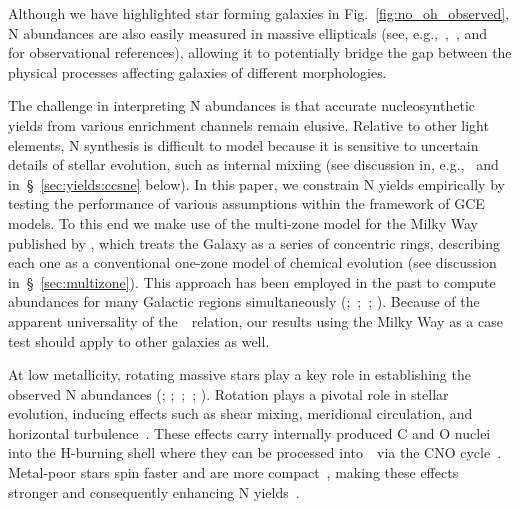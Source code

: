 \documentclass[ms.tex]{subfiles}
\begin{document}
Although we have highlighted star forming galaxies in
Fig.~\ref{fig:no_oh_observed}, N abundances are also easily measured in
massive ellipticals (see, e.g.,~\citealp{Schiavon2010},~\citealp{Conroy2013},
and~\citealp*{Conroy2014} for observational references), allowing it to
potentially bridge the gap between the physical processes affecting galaxies of
different morphologies.
\par
The challenge in interpreting N abundances is that accurate nucleosynthetic
yields from various enrichment channels remain elusive.
Relative to other light elements, N synthesis is difficult to model because it
is sensitive to uncertain details of stellar evolution, such as internal
mixiing (see discussion in, e.g.,~\citealp{Andrews2017} and
in~\S~\ref{sec:yields:ccsne} below).
In this paper, we constrain N yields empirically by testing the performance of
various assumptions within the framework of GCE models.
To this end we make use of the multi-zone model for the Milky Way published by
\citet{Johnson2021}, which treats the Galaxy as a series of concentric rings,
describing each one as a conventional one-zone model of chemical evolution
(see discussion in~\S~\ref{sec:multizone}).
This approach has been employed in the past to compute abundances for many
Galactic regions simultaneously (\citealp{Matteucci1989, Wyse1989, Prantzos1995,
Schoenrich2009};~\citealp*{Minchev2013, Minchev2014};~\citealp{Minchev2017};
\citealp*{Sharma2021}).
Because of the apparent universality of the~\ohno~relation, our results using
the Milky Way as a case test should apply to other galaxies as well.
\par
At low metallicity, rotating massive stars play a key role in establishing the
observed N abundances (\citealp*{Chiappini2003, Chiappini2005};
\citealp{Chiappini2006};~\citealp*{Kobayashi2011};~\citealp{Prantzos2018};
\citealp*{Grisoni2021}).
Rotation plays a pivotal role in stellar evolution, inducing effects such as
shear mixing, meridional circulation, and horizontal turbulence~\citep{Zahn1992, 
Maeder1998, Lagarde2012}.
These effects carry internally produced C and O nuclei into the H-burning shell
where they can be processed into~\Nfourteen~via the CNO cycle~\citep{Heger2010,
Frischknecht2016, Andrews2017}.
Metal-poor stars spin faster and are more compact~\citep*{Maeder1999}, making
these effects stronger and consequently enhancing N yields~\citep*{Meynet2002a,
Meynet2002b, Meynet2006}.
\end{document}
